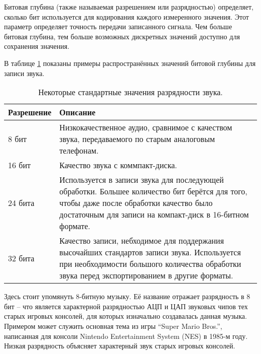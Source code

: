 \documentclass[../sparc.tex]{subfiles}
\begin{document}
Битовая глубина (также называемая разрешением или разрядностью) определяет,
сколько бит используется для кодирования каждого измеренного значения.  Этот
параметр определяет точность передачи записанного сигнала.  Чем больше битовая
глубина, тем больше возможных дискретных значений доступно для сохранения
значения.  \cite{audacityteam:bit-depth}

В таблице \ref{table:adc-sound-bit-depth-1} показаны примеры распространённых
значений битовой глубины для записи звука.

\begin{table}[h]
  \centering
  \begin{tabular}{p{2cm}|p{9cm}}
    Разрешение & Описание \\
    \hline \hline

    8 бит & Низкокачественное аудио, сравнимое с качеством звука, передаваемого
    по старым аналоговым телефонам. \\

    \hline

    16 бит & Качество звука с коммпакт-диска. \\

    \hline

    24 бита & Используется в записи звука для последующей обработки.  Большее
    количество бит берётся для того, чтобы даже после обработки качество было
    достаточным для записи на компакт-диск в 16-битном формате. \\

    \hline

    32 бита & Качество записи, небходимое для поддержания высочайших стандартов
    записи звука.  Используется при необходимости большого количества обработки
    звука перед экспортированием в другие форматы. \\

    \hline

  \end{tabular}
  \caption{Некоторые стандартные значения разрядности звука.}
  \label{table:adc-sound-bit-depth-1}
\end{table}

Здесь стоит упомянуть 8-битную музыку.  Её название отражает разрядность в 8 бит
-- что является характерной разрядностью \gls{АЦП} и \gls{ЦАП} звуковых чипов тех
старых игровых консолей, для которых изначально создавалась данная музыка.
Примером может служить основная тема из игры ``Super Mario Bros.'', написанная
для консоли Nintendo Entertainment System (NES) в 1985-м году.  Низкая
разрядность объясняет характерный звук старых игровых консолей.
\end{document}
